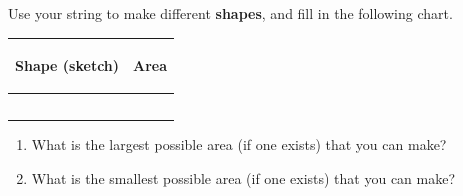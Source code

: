 \documentclass[noauthor,nooutcomes, handout]{ximera}
\begin{document}
\begin{problem} Use your string to make different {\bf shapes}, and fill in the following chart.
\vskip 0.1in
\begin{tabular}{|p{2.2in}|p{2.2in}|}
\hline
\begin{center} Shape (sketch) \end{center} & \begin{center} Area \end{center}  \\ \hline
 & \\ [10ex] \hline
 & \\ [10 ex] \hline
 & \\ [10 ex] \hline
 & \\ [10 ex] \hline
 & \\ [10 ex] \hline
\end{tabular}


\begin{enumerate}

\item What is the largest possible area (if one exists) that you can make?
\item What is the smallest possible area (if one exists) that you can make?
\end{enumerate}


\end{problem}
\end{document}
